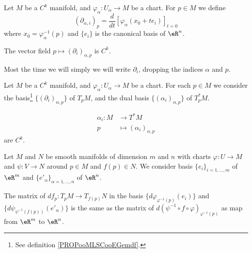 \begin{propositionDef}		\label{PROPooMLSCooEGemdf}
	Let \( M\) be a \( C^k\) manifold, and \(\varphi_{\alpha} \colon U_{\alpha}\to M  \) be a chart. For \( p\in M\) we define
	\begin{equation}
		(\partial_{\alpha, i})_p=\frac{d}{dt} \left[ \varphi_{\alpha}(x_0+te_i)  \right]_{t=0}
	\end{equation}
	where \( x_0=\varphi_{\alpha}^{-1}(p)\) and \( \{ e_i \}\) is the canonical basis of \( \eR^n\).

	The vector field \( p\mapsto (\partial_i)_{\alpha,p}\) is \( C^k\).

	Most the time we will simply we will write \( \partial_i\), dropping the indices \( \alpha\) and \( p\).
\end{propositionDef}

\begin{propositionDef}		\label{PROPooGSTWooPvvwIF}
	Let \( M\) be a \( C^k\) manifold, and \(\varphi_{\alpha} \colon U_{\alpha}\to M  \) be a chart. For each \( p\in M\) we consider the basis\footnote{See definition \ref{PROPooMLSCooEGemdf}.} \( \{ (\partial_i)_{\alpha,p} \}\) of \( T_pM\), and the dual basis \( \{ (\alpha_i)_{\alpha,p} \}\) of \( T^*_pM\).

	\begin{equation}
		\begin{aligned}
			\alpha_i\colon M & \to T^*M                      \\
			p                & \mapsto (\alpha_i)_{\alpha,p}
		\end{aligned}
	\end{equation}
	are \( C^k\).
\end{propositionDef}


\begin{lemma}       \label{LEMooVCSJooEuDZFz}
	Let \( M\) and \( N\) be smooth manifolds of dimension \( m\) and \( n\) with charts \( \varphi\colon U\to M\) and \( \psi\colon V\to N\) around \( p\in M\) and \( f(p)\in N\). We consider basis \( \{ e_i \}_{i=1,\ldots, m}\) of \( \eR^m\) and \( \{ e'_{\alpha} \}_{\alpha=1,\ldots, n}\) of \( \eR^n\).

	The matrix of \( df_p\colon T_pM\to T_{f(p)}N\) in the basis \( \{ d\varphi_{\varphi^{-1}(p)}(e_i) \}\) and \( \{ d\psi_{\psi^{-1}(f(p))}(e'_{\alpha}) \}\) is the same as the matrix of \( d(\psi^{-1}\circ f\circ\varphi)_{\varphi^{-1}(p)}\) as map from \( \eR^m\) to \( \eR^n\).
\end{lemma}

